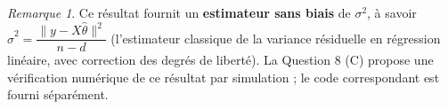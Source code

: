 \documentclass[11pt]{article}
\theoremstyle{remark}
\newtheorem*{remark}{Remarque}
\begin{document}
\begin{remark}
Ce résultat fournit un \textbf{estimateur sans biais} de $\sigma^2$, à savoir $\hat\sigma^2 = \dfrac{\|y-X\hat\theta\|^2}{n-d}$ (l'estimateur classique de la variance résiduelle en régression linéaire, avec correction des degrés de liberté). La Question 8 (C) propose une vérification numérique de ce résultat par simulation ; le code correspondant est fourni séparément.
\end{remark}
\end{document}

